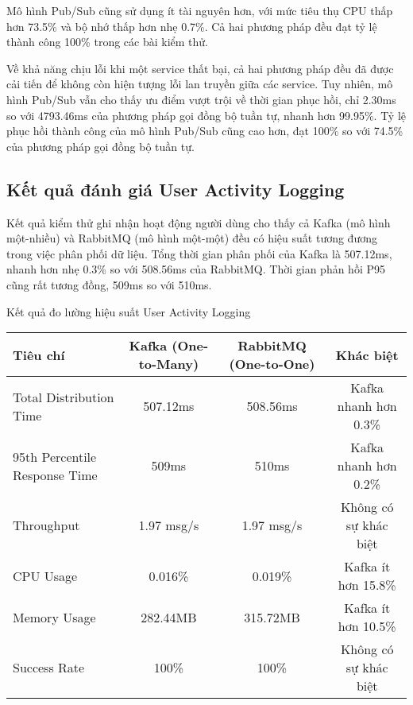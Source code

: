 Mô hình Pub/Sub cũng sử dụng ít tài nguyên hơn, với mức tiêu thụ CPU thấp hơn 73.5\% và bộ nhớ thấp hơn nhẹ 0.7\%. Cả hai phương pháp đều đạt tỷ lệ thành công 100\% trong các bài kiểm thử.

Về khả năng chịu lỗi khi một service thất bại, cả hai phương pháp đều đã được cải tiến để không còn hiện tượng lỗi lan truyền giữa các service. Tuy nhiên, mô hình Pub/Sub vẫn cho thấy ưu điểm vượt trội về thời gian phục hồi, chỉ 2.30ms so với 4793.46ms của phương pháp gọi đồng bộ tuần tự, nhanh hơn 99.95\%. Tỷ lệ phục hồi thành công của mô hình Pub/Sub cũng cao hơn, đạt 100\% so với 74.5\% của phương pháp gọi đồng bộ tuần tự.

\subsection{Kết quả đánh giá User Activity Logging}
Kết quả kiểm thử ghi nhận hoạt động người dùng cho thấy cả Kafka (mô hình một-nhiều) và RabbitMQ (mô hình một-một) đều có hiệu suất tương đương trong việc phân phối dữ liệu. Tổng thời gian phân phối của Kafka là 507.12ms, nhanh hơn nhẹ 0.3\% so với 508.56ms của RabbitMQ. Thời gian phản hồi P95 cũng rất tương đồng, 509ms so với 510ms.

\begin{table}[h]{Kết quả đo lường hiệu suất User Activity Logging}
    \centering
    {\setlength{\arrayrulewidth}{1pt}
    \renewcommand{\arraystretch}{1.5}
    \begin{tabular}{|l|c|c|c|}
        \hline
        \textbf{Tiêu chí}             & \textbf{Kafka (One-to-Many)} & \textbf{RabbitMQ (One-to-One)} & \textbf{Khác biệt}    \\
        \hline
        Total Distribution Time       & 507.12ms                     & 508.56ms                       & Kafka nhanh hơn 0.3\% \\
        95th Percentile Response Time & 509ms                        & 510ms                          & Kafka nhanh hơn 0.2\% \\
        Throughput                    & 1.97 msg/s                   & 1.97 msg/s                     & Không có sự khác biệt \\
        CPU Usage                     & 0.016\%                      & 0.019\%                        & Kafka ít hơn 15.8\%   \\
        Memory Usage                  & 282.44MB                     & 315.72MB                       & Kafka ít hơn 10.5\%   \\
        Success Rate                  & 100\%                        & 100\%                          & Không có sự khác biệt \\
        \hline
    \end{tabular}}
\end{table}


